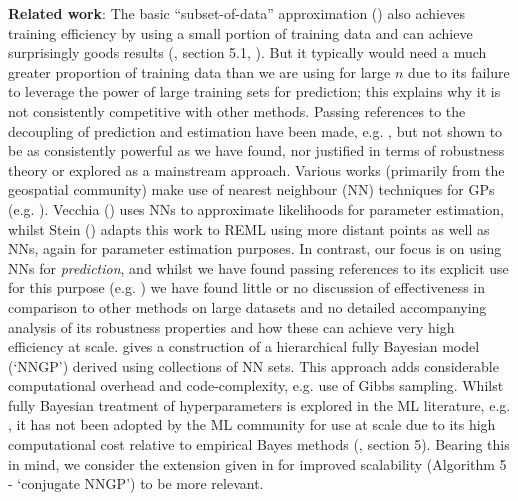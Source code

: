 \textbf{Related work}: The basic ``subset-of-data'' approximation (\cite{eval_framework}) also achieves training efficiency by using a small portion of training data and can achieve surprisingly goods results (\cite{eval_framework}, \cite{exact_big_GP} section 5.1, \cite{Graphon_SoD}). But it typically would need a much greater proportion of training data than we are using for large $n$ due to its failure to leverage the power of large training sets for prediction; this explains why it is not consistently competitive with other methods. Passing references to the decoupling of prediction and estimation have been made, e.g. \cite{Stein2004,Bachoc2022,eval_framework}, but not shown to be as consistently powerful as we have found, nor justified in terms of robustness theory or explored as a mainstream approach. Various works (primarily from the geospatial community) make use of nearest neighbour (NN) techniques for GPs (e.g. \cite{vecchia_estimation_1988,Stein2002,Stein2004,Datta2016a,Datta2016,Finley2019,Tran2020,Wu2022}). Vecchia (\cite{vecchia_estimation_1988}) uses NNs to approximate likelihoods for parameter estimation, whilst Stein (\cite{Stein2004}) adapts this work to REML using more distant points as well as NNs, again for parameter estimation purposes. In contrast, our focus is on using NNs for {\it prediction}, and whilst we have found passing references to its explicit use for this purpose (e.g. \cite{STEIN20141}) we have found little or no discussion of effectiveness in comparison to other methods on large datasets and no detailed accompanying analysis of its robustness properties and how these can achieve very high efficiency at scale. \cite{Datta2016} gives a construction of a hierarchical fully Bayesian model (`NNGP') derived using collections of NN sets. This approach adds considerable computational overhead and code-complexity, e.g. use of Gibbs sampling. Whilst fully Bayesian treatment of hyperparameters is explored in the ML literature, e.g. \cite{lalchand_approximate_2020}, it has not been adopted by the ML community for use at scale due to its high computational cost relative to empirical Bayes methods (\cite{lalchand_approximate_2020}, section 5). Bearing this in mind, we consider the extension given in \cite{Finley2019} for improved scalability (Algorithm 5 - `conjugate NNGP') to be more relevant.
%
